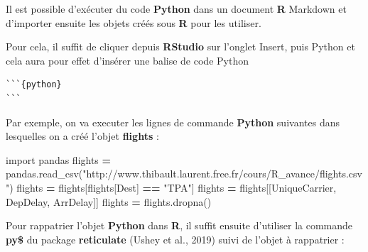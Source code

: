\documentclass[
]{book}
\newenvironment{Shaded}{\begin{snugshade}}{\end{snugshade}}
\newcommand{\FunctionTok}[1]{\textcolor[rgb]{0.00,0.00,0.00}{#1}}
\newcommand{\ImportTok}[1]{#1}
\newcommand{\NormalTok}[1]{#1}
\newcommand{\OperatorTok}[1]{\textcolor[rgb]{0.81,0.36,0.00}{\textbf{#1}}}
\newcommand{\SpecialCharTok}[1]{\textcolor[rgb]{0.00,0.00,0.00}{#1}}
\newcommand{\StringTok}[1]{\textcolor[rgb]{0.31,0.60,0.02}{#1}}
\theoremstyle{definition}
\theoremstyle{definition}
\theoremstyle{definition}
\theoremstyle{definition}
\theoremstyle{remark}
\begin{document}
Il est possible d'exécuter du code \textbf{Python} dans un document \textbf{R} Markdown et d'importer ensuite les objets créés sous \textbf{R} pour les utiliser.

Pour cela, il suffit de cliquer depuis \textbf{RStudio} sur l'onglet Insert, puis Python et cela aura pour effet d'insérer une balise de code Python

\begin{verbatim}
```{python}
```
\end{verbatim}

Par exemple, on va executer les lignes de commande \textbf{Python} suivantes dans lesquelles on a créé l'objet \textbf{flights} :

\begin{Shaded}
\begin{Highlighting}[]
\ImportTok{import}\NormalTok{ pandas}
\NormalTok{flights }\OperatorTok{=}\NormalTok{ pandas.read\_csv(}\StringTok{"http://www.thibault.laurent.free.fr/cours/R\_avance/flights.csv"}\NormalTok{)}
\NormalTok{flights }\OperatorTok{=}\NormalTok{ flights[flights[}\StringTok{\textquotesingle{}Dest\textquotesingle{}}\NormalTok{] }\OperatorTok{==} \StringTok{"TPA"}\NormalTok{]}
\NormalTok{flights }\OperatorTok{=}\NormalTok{ flights[[}\StringTok{\textquotesingle{}UniqueCarrier\textquotesingle{}}\NormalTok{, }\StringTok{\textquotesingle{}DepDelay\textquotesingle{}}\NormalTok{, }\StringTok{\textquotesingle{}ArrDelay\textquotesingle{}}\NormalTok{]]}
\NormalTok{flights }\OperatorTok{=}\NormalTok{ flights.dropna()}
\end{Highlighting}
\end{Shaded}

Pour rappatrier l'objet \textbf{Python} dans \textbf{R}, il suffit ensuite d'utiliser la commande \textbf{py\$} du package \textbf{reticulate} (Ushey et al., 2019) suivi de l'objet à rappatrier :

\begin{Shaded}
\end{Shaded}
\end{document}
